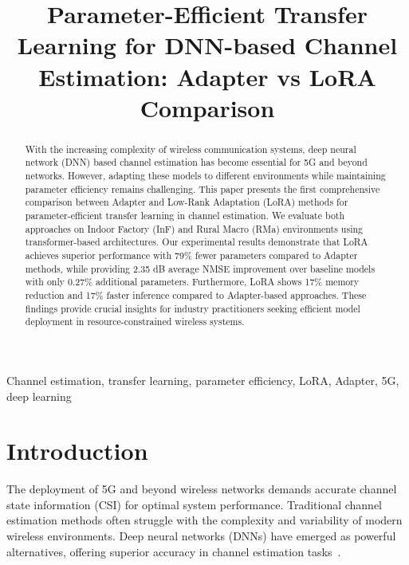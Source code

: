 \documentclass[conference]{IEEEtran}
\begin{document}
\title{Parameter-Efficient Transfer Learning for DNN-based Channel Estimation: Adapter vs LoRA Comparison}

\author{
}

\maketitle

\begin{abstract}
With the increasing complexity of wireless communication systems, deep neural network (DNN) based channel estimation has become essential for 5G and beyond networks. However, adapting these models to different environments while maintaining parameter efficiency remains challenging. This paper presents the first comprehensive comparison between Adapter and Low-Rank Adaptation (LoRA) methods for parameter-efficient transfer learning in channel estimation. We evaluate both approaches on Indoor Factory (InF) and Rural Macro (RMa) environments using transformer-based architectures. Our experimental results demonstrate that LoRA achieves superior performance with 79\% fewer parameters compared to Adapter methods, while providing 2.35 dB average NMSE improvement over baseline models with only 0.27\% additional parameters. Furthermore, LoRA shows 17\% memory reduction and 17\% faster inference compared to Adapter-based approaches. These findings provide crucial insights for industry practitioners seeking efficient model deployment in resource-constrained wireless systems.
\end{abstract}

\begin{IEEEkeywords}
Channel estimation, transfer learning, parameter efficiency, LoRA, Adapter, 5G, deep learning
\end{IEEEkeywords}

\section{Introduction}

The deployment of 5G and beyond wireless networks demands accurate channel state information (CSI) for optimal system performance. Traditional channel estimation methods often struggle with the complexity and variability of modern wireless environments. Deep neural networks (DNNs) have emerged as powerful alternatives, offering superior accuracy in channel estimation tasks~\cite{ye2018power, soltani2019deep}.
\end{document}

